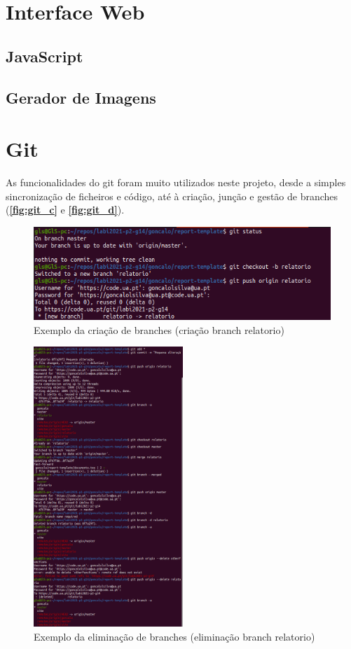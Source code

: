 \documentclass{report}
\begin{document}
\section{Interface Web}
\label{sec:interfaceWeb}

\subsection{JavaScript}
\label{ssec:JS}

\subsection{Gerador de Imagens}
\label{ssec:geradorImagens}

\section{Git}
\label{sec:git}
As funcionalidades do git foram muito utilizados neste projeto, desde a simples sincronização 
de ficheiros e código, até à criação, junção e gestão de branches (\textbf{\autoref{fig:git_c}} e 
\textbf{\autoref{fig:git_d}}). 
\cite{git}

\begin{figure}[!h]
\center 
\includegraphics[height=100pt]{img/git_1.png}
\caption{Exemplo da criação de branches (criação branch relatorio)}
\label{fig:git_c}
\end{figure}

\begin{figure}[!h]
\center 
\includegraphics[height=300pt]{img/git_2.png}
\caption{Exemplo da eliminação de branches (eliminação branch relatorio)}
\label{fig:git_d}
\end{figure}
\end{document}
